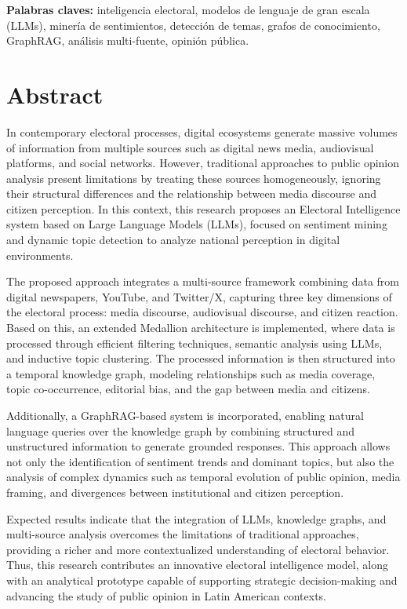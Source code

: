 \documentclass[listof=nochaptergap,12pt,times,authoryear]{report}
\begin{document}
\textbf{Palabras claves: } inteligencia electoral, modelos de lenguaje de gran escala (LLMs), minería de sentimientos, detección de temas, grafos de conocimiento, GraphRAG, análisis multi-fuente, opinión pública.

\clearpage

\chapter*{Abstract}

In contemporary electoral processes, digital ecosystems generate massive volumes of information from multiple sources such as digital news media, audiovisual platforms, and social networks. However, traditional approaches to public opinion analysis present limitations by treating these sources homogeneously, ignoring their structural differences and the relationship between media discourse and citizen perception. In this context, this research proposes an Electoral Intelligence system based on Large Language Models (LLMs), focused on sentiment mining and dynamic topic detection to analyze national perception in digital environments.

The proposed approach integrates a multi-source framework combining data from digital newspapers, YouTube, and Twitter/X, capturing three key dimensions of the electoral process: media discourse, audiovisual discourse, and citizen reaction. Based on this, an extended Medallion architecture is implemented, where data is processed through efficient filtering techniques, semantic analysis using LLMs, and inductive topic clustering. The processed information is then structured into a temporal knowledge graph, modeling relationships such as media coverage, topic co-occurrence, editorial bias, and the gap between media and citizens.

Additionally, a GraphRAG-based system is incorporated, enabling natural language queries over the knowledge graph by combining structured and unstructured information to generate grounded responses. This approach allows not only the identification of sentiment trends and dominant topics, but also the analysis of complex dynamics such as temporal evolution of public opinion, media framing, and divergences between institutional and citizen perception.

Expected results indicate that the integration of LLMs, knowledge graphs, and multi-source analysis overcomes the limitations of traditional approaches, providing a richer and more contextualized understanding of electoral behavior. Thus, this research contributes an innovative electoral intelligence model, along with an analytical prototype capable of supporting strategic decision-making and advancing the study of public opinion in Latin American contexts.
\end{document}
